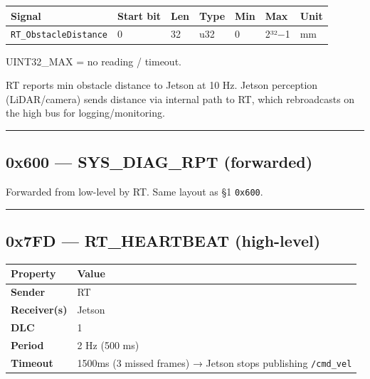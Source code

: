 \begin{longtable}[]{@{}lllllll@{}}
\toprule\noalign{}
Signal & Start bit & Len & Type & Min & Max & Unit \\
\midrule\noalign{}
\endhead
\bottomrule\noalign{}
\endlastfoot
\texttt{RT\_ObstacleDistance} & 0 & 32 & u32 & 0 & 2³²−1 & mm \\
\end{longtable}

UINT32\_MAX = no reading / timeout.

RT reports min obstacle distance to Jetson at 10 Hz. Jetson perception
(LiDAR/camera) sends distance via internal path to RT, which rebroadcasts on the
high bus for logging/monitoring.

\begin{center}\rule{0.5\linewidth}{0.5pt}\end{center}

\subsection{0x600 --- SYS\_DIAG\_RPT
(forwarded)}\label{x600-sys_diag_rpt-forwarded}

Forwarded from low-level by RT. Same layout as §1 \texttt{0x600}.

\begin{center}\rule{0.5\linewidth}{0.5pt}\end{center}

\subsection{0x7FD --- RT\_HEARTBEAT
(high-level)}\label{x7fd-rt_heartbeat-high-level}

\begin{longtable}[]{@{}ll@{}}
\toprule\noalign{}
Property & Value \\
\midrule\noalign{}
\endhead
\bottomrule\noalign{}
\endlastfoot
\textbf{Sender} & RT \\
\textbf{Receiver(s)} & Jetson \\
\textbf{DLC} & 1 \\
\textbf{Period} & 2 Hz (500 ms) \\
\textbf{Timeout} & 1500ms (3 missed frames) → Jetson stops publishing
\texttt{/cmd\_vel} \\
\end{longtable}

